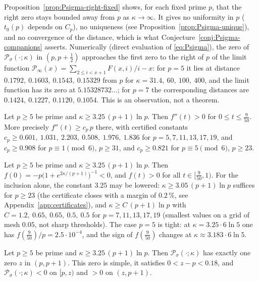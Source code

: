 \begin{remark}\label{rem:right-zero-limit}
Proposition~\ref{prop:Psigma-right-fixed} shows, for each fixed prime $p$, that the right zero stays bounded away from $p$ as $\kappa\to\infty$. It gives no uniformity in $p$ ($t_0(p)$ depends on $C_p$), no uniqueness (see Proposition~\ref{prop:Psigma-unique}), and no convergence of the distance, which is what Conjecture~\ref{conj:Psigma-companions} asserts. Numerically (direct evaluation of \eqref{eq:Psigma}), the zero of $\mathcal P_\sigma(\cdot;\kappa)$ in $(p,p+\tfrac12)$ approaches the first zero to the right of $p$ of the limit function $\mathcal P_\infty(x)=\sum_{2\le i<x+1}F(x,i)/i-x$: for $p=5$ it lies at distance $0.1792,\ 0.1603,\ 0.1543,\ 0.15329$ from $p$ for $\kappa=31.4,\ 60,\ 100,\ 400$, and the limit function has its zero at $5.15328732\ldots$; for $p=7$ the corresponding distances are $0.1424,\ 0.1227,\ 0.1120,\ 0.1054$. This is an observation, not a theorem.
\end{remark}

\begin{lemma}\label{lem:Psigma-convex}
Let $p\ge5$ be prime and $\kappa\ge3.25\,(p+1)\ln p$. Then $f''(t)>0$ for $0\le t\le\tfrac{9}{50}$. More precisely $f''(t)\ge c_p\,p$ there, with certified constants $c_p\ge0.601,\ 1.031,\ 2.203,\ 0.508,\ 1.976,\ 1.836$ for $p=5,7,11,13,17,19$, and $c_p\ge0.908$ for $p\equiv1\pmod 6$, $p\ge31$, and $c_p\ge0.821$ for $p\equiv5\pmod 6$, $p\ge23$.
\end{lemma}

\begin{lemma}\label{lem:Psigma-inclusion}
Let $p\ge5$ be prime and $\kappa\ge3.25\,(p+1)\ln p$. Then $f(0)=-p\bigl(1+e^{2\kappa/(p+1)}\bigr)^{-1}<0$, and $f(t)>0$ for all $t\in[\tfrac{9}{50},1)$. For the inclusion alone, the constant $3.25$ may be lowered: $\kappa\ge3.05\,(p+1)\ln p$ suffices for $p\ge23$ (the certificate closes with a margin of $0.2\,\%$, see Appendix~\ref{app:certificates}), and $\kappa\ge C\,(p+1)\ln p$ with $C=1.2,\ 0.65,\ 0.65,\ 0.5,\ 0.5$ for $p=7,11,13,17,19$ (smallest values on a grid of mesh $0.05$, not sharp thresholds). The case $p=5$ is tight: at $\kappa=3.25\cdot6\ln5$ one has $f(\tfrac{9}{50})/p=2.5\cdot10^{-4}$, and the sign of $f(\tfrac{9}{50})$ changes at $\kappa\approx3.183\cdot6\ln5$.
\end{lemma}

\begin{proposition}\label{prop:Psigma-unique}
Let $p\ge5$ be prime and $\kappa\ge3.25\,(p+1)\ln p$. Then $\mathcal P_\sigma(\cdot;\kappa)$ has exactly one zero $z$ in $(p,p+1)$. This zero is simple, it satisfies $0<z-p<0.18$, and $\mathcal P_\sigma(\cdot;\kappa)<0$ on $[p,z)$ and $>0$ on $(z,p+1)$.
\end{proposition}

